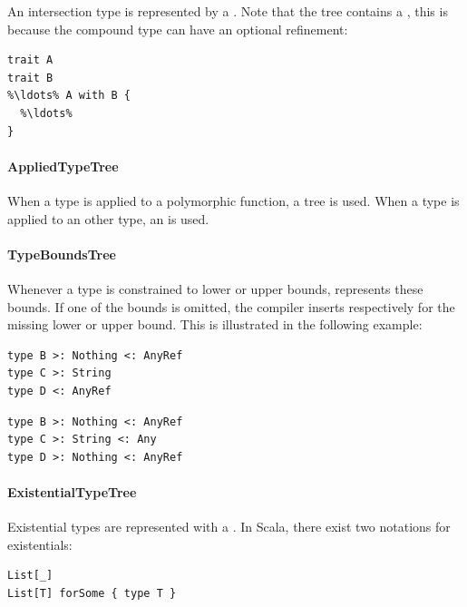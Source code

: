 \noindent An intersection type is represented by a . Note that the tree contains a , this is because the compound type can have an optional refinement: 

\begin{lstlisting}
trait A
trait B
%\ldots% A with B {
  %\ldots%
}
\end{lstlisting}

\paragraph{AppliedTypeTree} 

\noindent When a type is applied to a polymorphic function, a  tree is used. When a type is applied to an other type, an  is used.

\paragraph{TypeBoundsTree} 

\noindent Whenever a type is constrained to lower or upper bounds,  represents these bounds. If one of the bounds is omitted, the compiler inserts  respectively  for the missing lower or upper bound. This is illustrated in the following example:

\begin{multicols}{2}
\begin{lstlisting}
type B >: Nothing <: AnyRef
type C >: String
type D <: AnyRef
\end{lstlisting}
\begin{lstlisting}  
type B >: Nothing <: AnyRef
type C >: String <: Any
type D >: Nothing <: AnyRef
\end{lstlisting}
\end{multicols}

\paragraph{ExistentialTypeTree} 

\noindent Existential types are represented with a . In Scala, there exist two notations for existentials:

\begin{lstlisting}
List[_]
List[T] forSome { type T }
\end{lstlisting}

